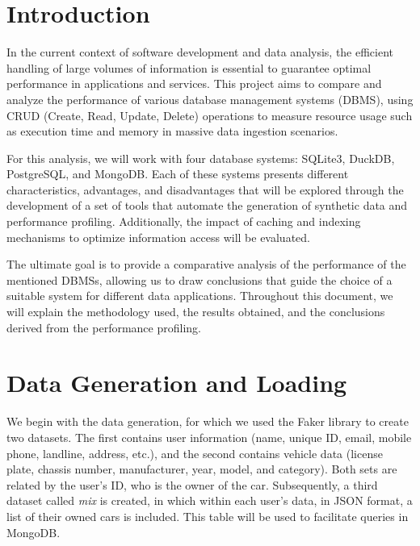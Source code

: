 \documentclass[11pt,a4paper]{article}
\begin{document}

\begin{abstract}
In the current context of software development and data analysis, the efficient handling of large volumes of information is essential to guarantee optimal performance in applications and services. This project aims to compare and analyze the performance of various database management systems (DBMS), using CRUD (Create, Read, Update, Delete) operations to measure resource usage such as execution time and memory in massive data ingestion scenarios.
\end{abstract}

\tableofcontents
\newpage

\section{Introduction}
In the current context of software development and data analysis, the efficient handling of large volumes of information is essential to guarantee optimal performance in applications and services. This project aims to compare and analyze the performance of various database management systems (DBMS), using CRUD (Create, Read, Update, Delete) operations to measure resource usage such as execution time and memory in massive data ingestion scenarios.

For this analysis, we will work with four database systems: SQLite3, DuckDB, PostgreSQL, and MongoDB. Each of these systems presents different characteristics, advantages, and disadvantages that will be explored through the development of a set of tools that automate the generation of synthetic data and performance profiling. Additionally, the impact of caching and indexing mechanisms to optimize information access will be evaluated.

The ultimate goal is to provide a comparative analysis of the performance of the mentioned DBMSs, allowing us to draw conclusions that guide the choice of a suitable system for different data applications. Throughout this document, we will explain the methodology used, the results obtained, and the conclusions derived from the performance profiling.

\section{Data Generation and Loading}
We begin with the data generation, for which we used the Faker library to create two datasets. The first contains user information (name, unique ID, email, mobile phone, landline, address, etc.), and the second contains vehicle data (license plate, chassis number, manufacturer, year, model, and category). Both sets are related by the user's ID, who is the owner of the car. Subsequently, a third dataset called \textit{mix} is created, in which within each user's data, in JSON format, a list of their owned cars is included. This table will be used to facilitate queries in MongoDB.
\end{document}
